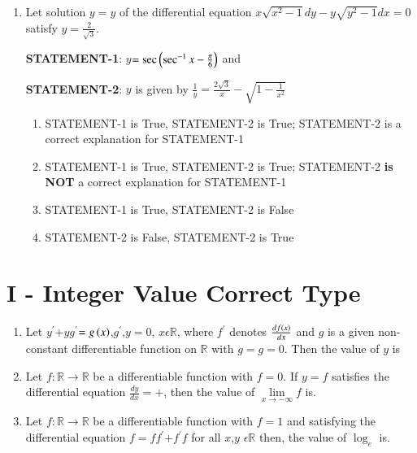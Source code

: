 \documentclass[journal]{IEEEtran}
\begin{document}
\begin{enumerate}
\item Let solution $y=y$ of the differential equation $x\sqrt{x^2-1}dy-y\sqrt{y^2-1}dx=0$ satisfy $y$$=\frac{2}{\sqrt3}$.

	\textbf{STATEMENT-1}: $y$$=\sec{\ensuremath{\left(\sec^{-1}{x}-\frac{\pi}{6}\right)}}$ and 

\textbf{STATEMENT-2}: $y$ is given by $\frac{1}{y}=\frac{2\sqrt3}{x}-\sqrt{1-\frac{1}{x^2}}$ 
\hfill{}
\begin{enumerate}
\item STATEMENT-1 is True, STATEMENT-2 is True; STATEMENT-2 is a correct explanation for STATEMENT-1
\item STATEMENT-1 is True, STATEMENT-2 is True; STATEMENT-2 \textbf{is NOT} a correct explanation for STATEMENT-1
\item STATEMENT-1 is True, STATEMENT-2 is False
\item STATEMENT-2 is False, STATEMENT-2 is True
\end{enumerate}
\end{enumerate}

\section{I - Integer Value Correct Type}

\begin{enumerate}
	\item Let $y^{\prime}$$+y$$g^{\prime}$$=g\left(x\right)$,$g^{\prime}$,$y$$=0$, $x\epsilon\mathbb{R}$, where $f^{\prime}$ denotes $\frac{{df\left(x\right)}}{dx}$ and $g$ is a given non-constant differentiable function on $\mathbb{R}$ with $g$$=g$$=0$. Then the value of $y$ is 
		\hfill{}

\item Let $f:\mathbb{R}\to\mathbb{R}$ be a differentiable function with $f$$=0$. If $y=f$ satisfies the differential equation $\frac{dy}{dx}=$$+$, then the value of $\lim\limits_{x\to-\infty}f$ is. 

	\hfill{}

	\item Let $f:\mathbb{R}\to\mathbb{R}$ be a differentiable function with $f$$=1$ and satisfying the differential equation $f$$=f$$f^{\prime}$$+f^{\prime}$$f$ for all $x$,$y$ $\epsilon \mathbb{R}$ then, the value of $\log_e$  is. 
		\hfill{}

\end{enumerate}
\end{document}
